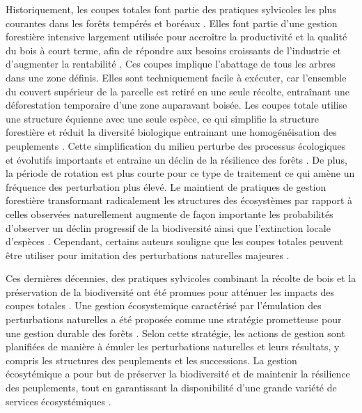 Historiquement, les coupes totales font partie des pratiques sylvicoles les plus courantes dans les forêts tempérés et boréaux \citep{Fedrowitz2014Canretention}. 
Elles font partie d'une gestion forestière intensive largement utilisée pour accroître la productivité et la qualité du bois à court terme, afin de répondre aux besoins croissants de l'industrie et d'augmenter la rentabilité \citep{Irland2011TimberProductivitya}.
Ces coupes implique l'abattage de tous les arbres dans une zone définis.
Elles sont techniquement facile à exécuter, car l'ensemble du couvert supérieur de la parcelle est retiré en une seule récolte, entraînant une déforestation temporaire d'une zone auparavant boisée. 
Les coupes totale utilise une structure équienne avec une seule espèce, ce qui simplifie la structure forestière et réduit la diversité biologique entrainant une homogénéisation des peuplements \citep{Rosenvald2008whatwhen}. 
Cette simplification du milieu perturbe des processus écologiques et évolutifs importants et entraine un déclin de la résilience des forêts \citep{Holling2001UnderstandingComplexity}. 
De plus, la période de rotation est plus courte pour ce type de traitement ce qui amène un fréquence des perturbation plus élevé. 
Le maintient de pratiques de gestion forestière transformant radicalement les structures des écosystèmes par rapport à celles observées naturellement augmente de façon importante les probabilités d'observer un déclin progressif de la biodiversité ainsi que l'extinction locale d'espèces \citep{Hanski2000Extinctiondebt}.  
Cependant, certains auteurs souligne que les coupes totales peuvent être utiliser pour imitation des perturbations naturelles majeures \citep{Greenberg1995comparisonbird}. 

Ces dernières décennies, des pratiques sylvicoles combinant la récolte de bois et la préservation de la biodiversité ont été promues pour atténuer les impacts des coupes totales \citep{Gustafsson2012Retentionforestry}.
Une gestion écosystemique caractérisé par l'émulation des perturbations naturelles a été proposée comme une stratégie prometteuse pour une gestion durable des forêts \citep{Perry1998scientificbasis,Kuuluvainen2002Naturalvariabilitya}. 
Selon cette stratégie, les actions de gestion sont planifiées de manière à émuler les perturbations naturelles et leurs résultats, y compris les structures des peuplements et les successions. 
La gestion écosytémique a pour but de préserver la biodiversité et de maintenir la résilience des peuplements, tout en garantissant la disponibilité d'une grande variété de services écosystémiques \citep{Szaro1998emergenceecosystem,MacDicken2015Globalprogress}.

